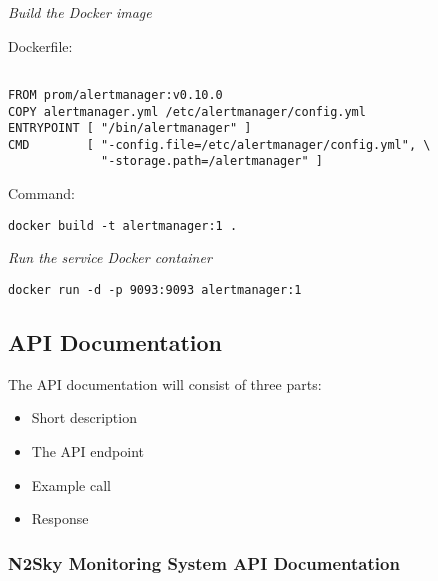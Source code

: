 \emph{Build the Docker image}

Dockerfile:
 \begin{lstlisting}

FROM prom/alertmanager:v0.10.0
COPY alertmanager.yml /etc/alertmanager/config.yml
ENTRYPOINT [ "/bin/alertmanager" ]
CMD        [ "-config.file=/etc/alertmanager/config.yml", \
             "-storage.path=/alertmanager" ]

\end{lstlisting}

Command: 

 \begin{lstlisting}
docker build -t alertmanager:1 .
\end{lstlisting}


\emph{Run the service Docker container}
 \begin{lstlisting}
docker run -d -p 9093:9093 alertmanager:1
\end{lstlisting}


\subsection{API Documentation}\label{API Documentation}

The API documentation will consist of three parts:
\begin{itemize}
\item Short description
\item The API endpoint
\item Example call
\item Response
\end{itemize}

\subsubsection{N2Sky Monitoring System API Documentation}\label{N2Sky Monitoring System API Documentation}

